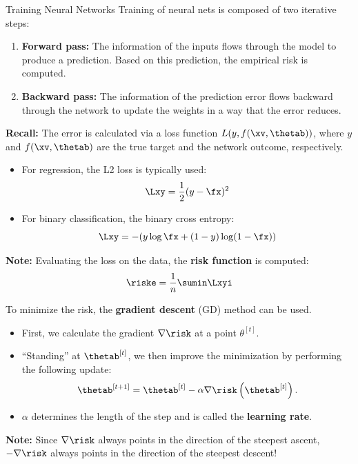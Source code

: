 







\begin{vbframe}{Training Neural Networks}
\lz
Training of neural nets is composed of two iterative steps:
\lz
\begin{enumerate}
\item \textbf{Forward pass:} The information of the inputs flows through the model to produce a prediction. Based on this prediction, the empirical risk is computed.
\lz
\item \textbf{Backward pass:} The information of the prediction error flows backward through the network to update the weights in a way that the error reduces.
\end{enumerate}
\lz

\textbf{Recall:} The error is calculated via a loss function $L(y, f(\xv, \thetab))$, where $y$ and $f(\xv, \thetab)$ are the true target and the network outcome, respectively.
\framebreak

\lz
\lz
\begin{itemize}
\item For regression, the L2 loss is typically used:
$$\Lxy = \frac{1}{2}(y - \fx)^2$$
\item For binary classification, the binary cross entropy:
$$\Lxy = - (y \log \fx + (1 - y) \log(1 - \fx))$$
\end{itemize}
\lz
\textbf{Note:} Evaluating the loss on the data, the \textbf{risk function} is computed:
$$\riske = \frac{1}{n} \sumin \Lxyi$$
\framebreak

\lz
To minimize the risk, the \textbf{gradient descent} (GD) method can be used.
\lz
\begin{itemize}
\item First, we calculate the gradient $\nabla \risk$ at a point $\theta^{[t]}$.
\lz
\item \enquote{Standing} at $\thetab^{[t]}$, we then improve the minimization by performing the following update:
$$\thetab^{[t + 1 ]}  = \thetab^{[t]} - \alpha \nabla \risk\left(\thetab^{[t]}\right).$$
\item $\alpha$ determines the length of the step and is called the \textbf{learning rate}.
\end{itemize}
\lz
\lz
\textbf{Note:} Since $\nabla \risk$ always points in the direction of the steepest ascent, $-\nabla \risk$ always points in the direction of the steepest descent!
\end{vbframe}

